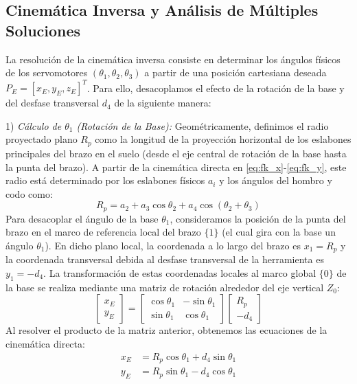 \documentclass[conference,a4paper]{IEEEtran}
\begin{document}
\subsection{Cinemática Inversa y Análisis de Múltiples Soluciones}
La resolución de la cinemática inversa consiste en determinar los ángulos físicos de los servomotores $(\theta_1, \theta_2, \theta_3)$ a partir de una posición cartesiana deseada $P_E = [x_E, y_E, z_E]^T$. Para ello, desacoplamos el efecto de la rotación de la base y del desfase transversal $d_4$ de la siguiente manera:

1) \textit{Cálculo de $\theta_1$ (Rotación de la Base):} 
Geométricamente, definimos el radio proyectado plano $R_p$ como la longitud de la proyección horizontal de los eslabones principales del brazo en el suelo (desde el eje central de rotación de la base hasta la punta del brazo). A partir de la cinemática directa en \eqref{eq:fk_x}-\eqref{eq:fk_y}, este radio está determinado por los eslabones físicos $a_i$ y los ángulos del hombro y codo como:
\begin{equation}
R_p = a_2 + a_3 \cos\theta_2 + a_4 \cos(\theta_2 + \theta_3)
\label{eq:ik_rp_geom}
\end{equation}
Para desacoplar el ángulo de la base $\theta_1$, consideramos la posición de la punta del brazo en el marco de referencia local del brazo $\{1\}$ (el cual gira con la base un ángulo $\theta_1$). En dicho plano local, la coordenada a lo largo del brazo es $x_1 = R_p$ y la coordenada transversal debida al desfase transversal de la herramienta es $y_1 = -d_4$. La transformación de estas coordenadas locales al marco global $\{0\}$ de la base se realiza mediante una matriz de rotación alrededor del eje vertical $Z_0$:
\begin{equation}
\begin{bmatrix} x_E \\ y_E \end{bmatrix} = \begin{bmatrix} \cos\theta_1 & -\sin\theta_1 \\ \sin\theta_1 & \cos\theta_1 \end{bmatrix} \begin{bmatrix} R_p \\ -d_4 \end{bmatrix}
\label{eq:ik_rotacion_base}
\end{equation}
Al resolver el producto de la matriz anterior, obtenemos las ecuaciones de la cinemática directa:
\begin{align}
x_E &= R_p \cos\theta_1 + d_4 \sin\theta_1 \label{eq:ik_proj_x} \\
y_E &= R_p \sin\theta_1 - d_4 \cos\theta_1 \label{eq:ik_proj_y}
\end{align}
\end{document}
